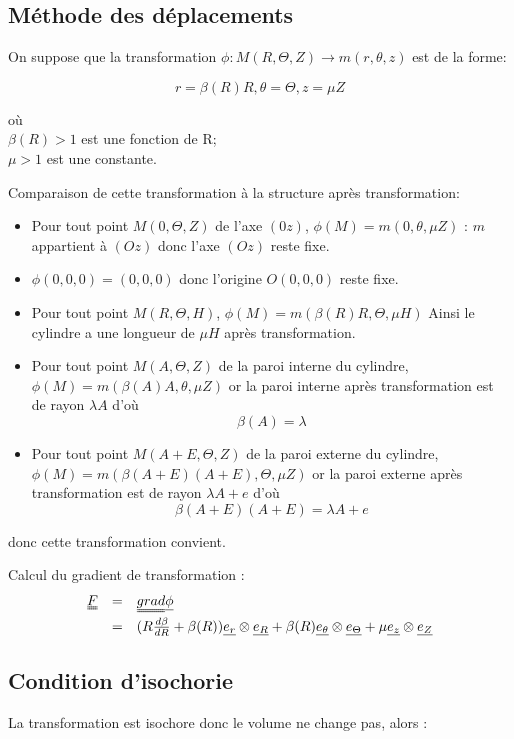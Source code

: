 \documentclass[a4paper,11pt]{article}
\newcommand{\tens}{\uuline}
\begin{document}
\subsection{Méthode des déplacements}
On suppose que la transformation $\phi : M(R,\Theta, Z) \rightarrow m(r, \theta, z)$ est de la forme:

$$r=\beta(R)R, \theta=\Theta, z=\mu Z$$

\begin{flushleft}
où\\
$\beta(R)>1$ est une fonction de R;\\
$\mu>1$ est une constante.
\end{flushleft}

Comparaison de cette transformation à la structure après transformation:
\begin{itemize}
\item Pour tout point $M(0, \Theta, Z)$ de l'axe $(0z)$, $\phi(M) = m(0, \theta, \mu Z)$ : $m$ appartient à $(Oz)$ donc l'axe $(Oz)$ reste fixe.
\item $\phi (0, 0, 0) = (0, 0, 0)$ donc l'origine $O(0, 0, 0)$ reste fixe.
\item Pour tout point $M(R, \Theta, H)$,  $\phi(M) = m(\beta (R) R, \Theta, \mu H)$ Ainsi le cylindre a une longueur de $\mu H$ après transformation.
\item Pour tout point $M(A, \Theta, Z)$ de la paroi interne du cylindre, $\phi(M) = m(\beta(A) A, \theta, \mu Z)$ or la paroi interne après transformation est de rayon $\lambda A$ d'où $$\beta(A) = \lambda$$
\item Pour tout point $M(A+E, \Theta, Z)$ de la paroi externe du cylindre, $\phi(M) = m(\beta(A+E) (A+E), \Theta, \mu Z)$ or la paroi externe après transformation est de rayon $\lambda A + e$ d'où
$$\beta(A+E)(A+E) = \lambda A+ e$$
\end{itemize}
donc cette transformation convient.

Calcul du gradient de transformation :
$$
\begin{array}{rcl}
\tens{F} &=& \tens{grad} \uline{\phi}\\
&=& (R\frac{d\beta}{dR} +\beta(R)) \uline{e_r}\otimes \uline{e_R} + \beta(R) \uline{e_\theta}\otimes \uline{e_\Theta} + \mu \uline{e_z}\otimes \uline{e_Z}
\end{array}
$$

\subsection{Condition d'isochorie}
La transformation est isochore donc le volume ne change pas, alors :
\end{document}
